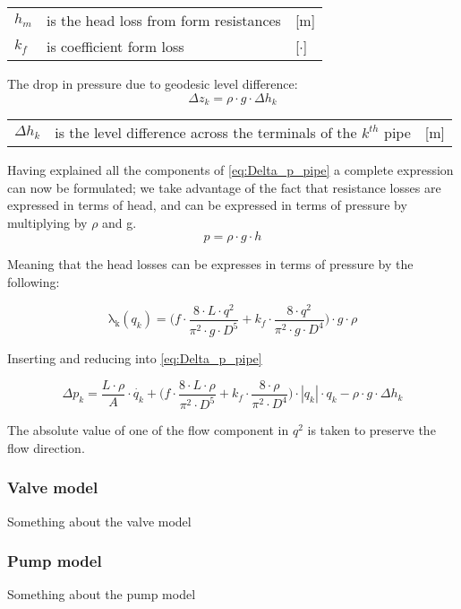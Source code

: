 \begin{center}
	\begin{tabular}{l p{8cm} l}
		$h_{m}$ & is the head loss from form resistances & [\si{m}]\\
		$k_{f}$ &  is coefficient form loss & [$\cdot$]\\
	\end{tabular}
\end{center}

The drop in pressure due to geodesic level difference:
\begin{equation}
	\Delta{z_{k}} = \rho \cdot g \cdot \Delta{h_{k}}
\end{equation}

\begin{center}
	\begin{tabular}{l p{8cm} l}
		$\Delta{h_{k}}$ &  is the level difference across the terminals of the $k^{th}$ pipe & [\si{m}]\\
	\end{tabular}
\end{center}

Having explained all the components of \eqref{eq:Delta_p_pipe} a complete expression can now be formulated; we take advantage of the fact that resistance losses are expressed in terms of head, and can be expressed in terms of pressure by multiplying by $\rho$ and g. \begin{equation}
	p = \rho \cdot g \cdot h  
\end{equation}

Meaning that the head losses can be expresses in terms of pressure by the following:

\begin{equation}
\mathrm{\lambda_{k}}(q_{k})  =	\Big(f \cdot \frac{8\cdot L\cdot q^{2}}{\pi^{2}\cdot g \cdot D^{5}} + k_{f}\cdot \frac{8\cdot q^{2}}{\pi^{2}\cdot g \cdot D^{4}}\Big)\cdot g \cdot \rho
\end{equation}

Inserting and reducing into \cref{eq:Delta_p_pipe}

\begin{equation}
	\Delta{p_{k}} = \frac{L\cdot \rho}{A}\cdot \dot{q_{k}}
	+\Big(f \cdot \frac{8\cdot L\cdot \rho}{\pi^{2} \cdot D^{5}} + k_{f}\cdot \frac{8\cdot \rho}{\pi^{2} \cdot D^{4}}\Big)\cdot |q_{k}|\cdot q_{k} 
	- \rho \cdot g \cdot \Delta{h_{k}}
\end{equation}

The absolute value of one of the flow component in $q^{2}$ is taken to preserve the flow direction.


\subsubsection{Valve model}
Something about the valve model

\subsubsection{Pump model}
Something about the pump model
